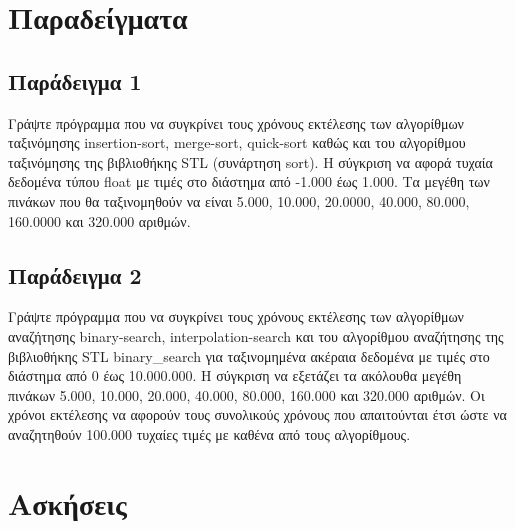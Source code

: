 





\section{Παραδείγματα}
\subsection{Παράδειγμα 1}
Γράψτε πρόγραμμα που να συγκρίνει τους χρόνους εκτέλεσης των αλγορίθμων ταξινόμησης insertion-sort, merge-sort, quick-sort καθώς και του αλγορίθμου ταξινόμησης της βιβλιοθήκης STL (συνάρτηση sort). Η σύγκριση να αφορά τυχαία δεδομένα τύπου float με τιμές στο διάστημα από -1.000 έως 1.000. Τα μεγέθη των πινάκων που θα ταξινομηθούν να είναι 5.000, 10.000, 20.0000, 40.000, 80.000, 160.0000 και 320.000 αριθμών. 






\subsection{Παράδειγμα 2}
Γράψτε πρόγραμμα που να συγκρίνει τους χρόνους εκτέλεσης των αλγορίθμων αναζήτησης binary-search, interpolation-search και του αλγορίθμου αναζήτησης της βιβλιοθήκης STL binary\_search για ταξινομημένα ακέραια δεδομένα με τιμές στο διάστημα από 0  έως 10.000.000. Η σύγκριση να εξετάζει τα ακόλουθα μεγέθη πινάκων 5.000, 10.000, 20.000, 40.000, 80.000, 160.000 και 320.000 αριθμών. Οι χρόνοι εκτέλεσης να αφορούν τους συνολικούς χρόνους που απαιτούνται έτσι ώστε να αναζητηθούν 100.000 τυχαίες τιμές με καθένα από τους αλγορίθμους. 






\section{Ασκήσεις}





